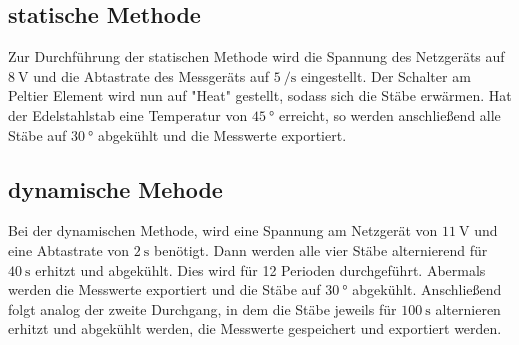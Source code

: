 \subsection{statische Methode}
Zur Durchführung der statischen Methode wird die Spannung des Netzgeräts auf $\SI{8}{\volt}$ und die
Abtastrate des Messgeräts auf $\SI{5}{\per \second}$ eingestellt. Der Schalter am Peltier Element wird
nun auf "Heat" gestellt, sodass sich die Stäbe erwärmen. Hat der Edelstahlstab eine Temperatur
von $\SI{45}{\degree}$ erreicht, so werden anschließend alle Stäbe auf $\SI{30}{\degree}$ abgekühlt
und die Messwerte exportiert.

\subsection{dynamische Mehode}
Bei der dynamischen Methode, wird eine Spannung am Netzgerät von $\SI{11}{\volt}$ und
eine Abtastrate von $\SI{2}{\second}$ benötigt. Dann werden alle vier Stäbe alternierend
für $\SI{40}{\second}$ erhitzt und abgekühlt. Dies wird für 12 Perioden durchgeführt.
Abermals werden die Messwerte exportiert und die Stäbe auf $\SI{30}{\degree}$
abgekühlt. Anschließend folgt analog der zweite Durchgang, in dem die Stäbe jeweils für
$\SI{100}{\second}$ alternieren erhitzt und abgekühlt werden, die Messwerte gespeichert und exportiert werden.

\newpage
\nocite{*}
\printbibliography
